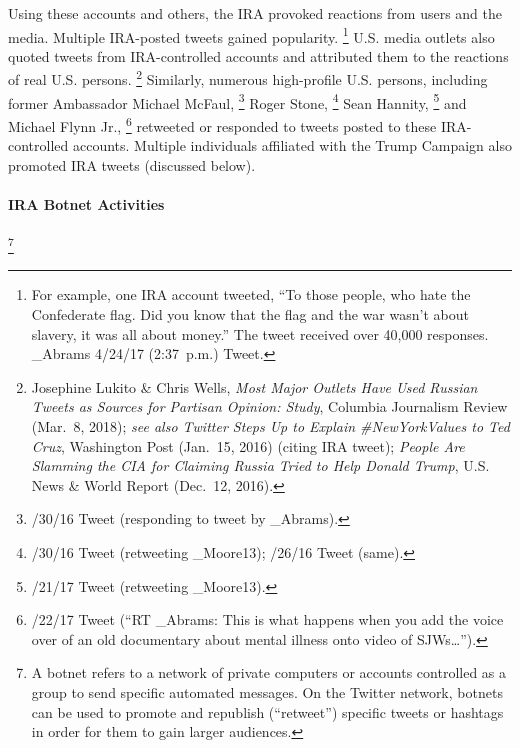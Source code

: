 Using these accounts and others, the IRA provoked reactions from users and the media.
Multiple IRA-posted tweets gained popularity.%
\footnote{For example, one IRA account tweeted, ``To those people, who hate the Confederate flag.
Did you know that the flag and the war wasn't about slavery, it was all about money.''
The tweet received over 40,000 responses.
\@Jenn\_Abrams 4/24/17 (2:37~p.m.) Tweet.}
U.S. media outlets also quoted tweets from IRA-controlled accounts and attributed them to the reactions of real U.S. persons.%
\footnote{Josephine Lukito \& Chris Wells, \textit{Most Major Outlets Have Used Russian Tweets as Sources for Partisan Opinion: Study}, Columbia Journalism Review (Mar.~8, 2018);
\textit{see also Twitter Steps Up to Explain \#NewYorkValues to Ted Cruz}, Washington Post (Jan.~15, 2016) (citing IRA tweet);
\textit{People Are Slamming the CIA for Claiming Russia Tried to Help Donald Trump}, U.S. News \& World Report (Dec.~12, 2016).}
Similarly, numerous high-profile U.S. persons, including former Ambassador Michael McFaul,%
\footnote{/30/16 Tweet (responding to tweet by \@Jenn\_Abrams).} Roger Stone,%
\footnote{/30/16 Tweet (retweeting \@Pamela\_Moore13);
/26/16 Tweet (same).}
Sean Hannity,%
\footnote{/21/17 Tweet (retweeting \@Pamela\_Moore13).}
and Michael Flynn Jr.,%
\footnote{/22/17 Tweet (``RT \@Jenn\_Abrams: This is what happens when you add the voice over of an old documentary about mental illness onto video of SJWs\dots'').}
retweeted or responded to tweets posted to these IRA-controlled accounts.
Multiple individuals affiliated with the Trump Campaign also promoted IRA tweets (discussed below).

\paragraph{IRA Botnet Activities}

\footnote{A botnet refers to a network of private computers or accounts controlled as a group to send specific automated messages.
On the Twitter network, botnets can be used to promote and republish (``retweet'') specific tweets or hashtags in order for them to gain larger audiences.}

